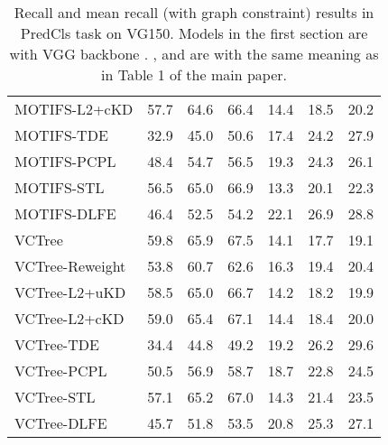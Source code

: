 \documentclass[sigconf]{acmart}
\begin{document}
\begin{table*}[htbp]
{\begin{tabular}{l|c c c c c c}
MOTIFS-L2+cKD\textsuperscript{} \cite{DBLP:conf/bmvc/WangPL20} & 57.7 & 64.6 & 66.4 & 14.4 & 18.5 & 20.2 \\
MOTIFS-TDE\textsuperscript{} \cite{tang2020unbiased} & 32.9 & 45.0 & 50.6 & 17.4 & 24.2 & 27.9 \\
MOTIFS-PCPL\textsuperscript{} \cite{yan2020pcpl} & 48.4 & 54.7 & 56.5 & 19.3 & 24.3 & 26.1 \\
MOTIFS-STL\textsuperscript{} \cite{chen2019soft} & 56.5 & 65.0 & 66.9 & 13.3 & 20.1 & 22.3 \\
MOTIFS-DLFE & 46.4 & 52.5 & 54.2 & 22.1 & 26.9 & 28.8 \\
\hline
VCTree\textsuperscript{} \cite{tang2019learning,tang2020unbiased} & 59.8 & 65.9 & 67.5 & 14.1 & 17.7 & 19.1 \\
VCTree-Reweight\textsuperscript{} & 53.8 & 60.7 & 62.6 & 16.3 & 19.4 & 20.4 \\
VCTree-L2+uKD\textsuperscript{} \cite{DBLP:conf/bmvc/WangPL20} & 58.5 & 65.0 & 66.7 & 14.2 & 18.2 & 19.9 \\ 
VCTree-L2+cKD\textsuperscript{} \cite{DBLP:conf/bmvc/WangPL20} & 59.0 & 65.4 & 67.1 & 14.4 & 18.4 & 20.0 \\ 
VCTree-TDE\textsuperscript{} \cite{tang2020unbiased} & 34.4 & 44.8 & 49.2 & 19.2 & 26.2 & 29.6 \\
VCTree-PCPL\textsuperscript{} \cite{yan2020pcpl} & 50.5 & 56.9 & 58.7 & 18.7 & 22.8 & 24.5 \\
VCTree-STL\textsuperscript{} \cite{chen2019soft} & 57.1 & 65.2 & 67.0 & 14.3 & 21.4 & 23.5 \\
VCTree-DLFE & 45.7 & 51.8 & 53.5 & 20.8 & 25.3 & 27.1 \\
\hline
\end{tabular}
}
\vspace{0.1em}
\caption{Recall and mean recall (with graph constraint) results in PredCls task on VG150. 
Models in the first section are with VGG backbone \cite{simonyan2014very}.
,  and  are with the same meaning as in Table 1 of the main paper.
}
\label{tab:sgg_result_predcls}
\end{table*}
\end{document}
